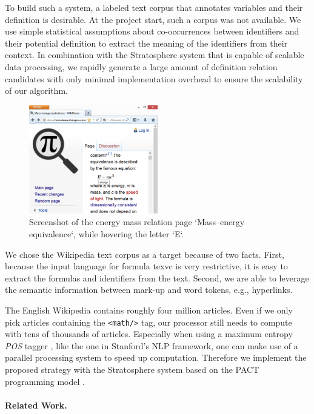 \documentclass[runningheads]{llncs}
\begin{document}
To build such a system, a labeled text corpus that annotates variables
and their definition is desirable.
At the project start, such a corpus was not available.
We use simple statistical assumptions about co-occurrences between identifiers
and their potential definition to extract the meaning of the identifiers from their context.
In combination with the Stratosphere system
that is capable of scalable data processing,  we rapidly generate a large amount of 
definition relation 
candidates with only minimal implementation overhead to ensure the scalability of our algorithm.

\begin{figure}
        \label{fig:screenshot}
  \includegraphics[width=0.5\textwidth]{screenshot}
  \caption{Screenshot of the energy mass relation page `Mass–energy equivalence`, while hovering the letter `E`.}
  \vspace{-20pt}
\end{figure}
We chose the Wikipedia text corpus as a target because of two facts.
First, because the input language for formula texvc is very restrictive, it is easy to extract the formulas and identifiers from the text.
Second, we are able to leverage the semantic information between mark-up and
word tokens, e.g., hyperlinks.

The English Wikipedia contains roughly four million articles.
Even if we only
pick articles containing the \texttt{<math/>} tag, our processor still needs
to compute with tens of thousands of articles.
Especially when using a maximum
entropy \emph{POS} tagger \cite{Rathna96}, like the one in Stanford's NLP
framework, one can make use of a parallel processing system to speed up
computation.
Therefore we implement the proposed strategy with the Stratosphere system based
on the PACT programming model \cite{Alexandrov2010}.


\paragraph{Related Work.}
\end{document}
